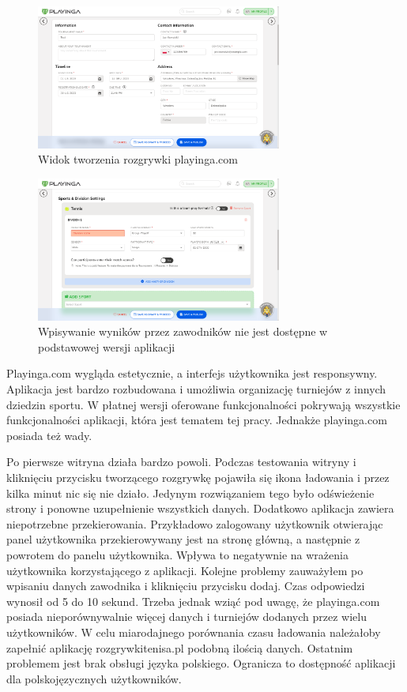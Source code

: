 \documentclass[shortabstract]{iithesis}
\begin{document}
\begin{figure}[H]
    \centering
    \includegraphics[width=0.72\textwidth,valign=t]{assets/alt_rozw/playinga_tworzenie.png}
    \caption{Widok tworzenia rozgrywki playinga.com}
\end{figure}
\begin{figure}[H]
    \centering
    \includegraphics[width=0.72\textwidth,valign=t]{assets/alt_rozw/playinga_tworzenie2.png}
    \caption{Wpisywanie wyników przez zawodników nie jest dostępne w podstawowej wersji aplikacji}
\end{figure}
Playinga.com wygląda estetycznie, a interfejs użytkownika jest responsywny. Aplikacja jest bardzo rozbudowana i umożliwia organizację turniejów z innych dziedzin sportu.
W płatnej wersji oferowane funkcjonalności pokrywają wszystkie funkcjonalności aplikacji, która jest tematem tej pracy.
Jednakże playinga.com posiada też wady.
\par
Po pierwsze witryna działa bardzo powoli.
Podczas testowania witryny i kliknięciu przycisku tworzącego rozgrywkę pojawiła się ikona ładowania i przez kilka minut nic się nie działo.
Jedynym rozwiązaniem tego było odświeżenie strony i ponowne uzupełnienie wszystkich danych.
Dodatkowo aplikacja zawiera niepotrzebne przekierowania.
Przykładowo zalogowany użytkownik otwierając panel użytkownika przekierowywany jest na stronę główną, a następnie z powrotem do panelu użytkownika.
Wpływa to negatywnie na wrażenia użytkownika korzystającego z aplikacji.
Kolejne problemy zauważyłem po wpisaniu danych zawodnika i kliknięciu przycisku dodaj.
Czas odpowiedzi wynosił od 5 do 10 sekund. Trzeba jednak wziąć pod uwagę, że playinga.com posiada nieporównywalnie więcej danych i turniejów dodanych przez wielu użytkowników.
W celu miarodajnego porównania czasu ładowania należałoby zapełnić aplikację rozgrywkitenisa.pl podobną ilością danych.
Ostatnim problemem jest brak obsługi języka polskiego. Ogranicza to dostępność aplikacji dla polskojęzycznych użytkowników.
\end{document}
